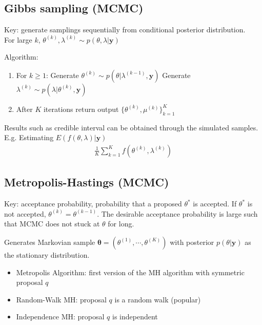       \subsection{Gibbs sampling (MCMC)}

      Key: generate samplings sequentially from conditional
      posterior distribution.\\For large $k$,
      $\theta^{(k)}, \lambda^{(k)}\sim p(\theta,
      \lambda|\mathbf{y})$

      Algorithm:

      \begin{enumerate}
          \item For $k\geq 1$:
              \subitem[1.1] Generate $\theta^{(k)}\sim p(\theta| \lambda^{(k-1)}, \mathbf{y})$
              \subitem[1.2] Generate $\lambda^{(k)}\sim p(\lambda| \theta^{(k)}, \mathbf{y})$
          \item After $K$ iterations return output
              $\{\theta^{(k)}, \mu^{(k)}\}_{k=1}^K$
      \end{enumerate}

      Results such as credible interval can be obtained
      through the simulated samples.
      E.g. Estimating $E(f(\theta, \lambda)|\mathbf{y})$
      \begin{align*}
          \frac{1}{K}\sum_{k=1}^K f(\theta^{(k)},
          \lambda^{(k)})
      \end{align*}

      \subsection{Metropolis-Hastings (MCMC)}

      Key: acceptance probability, probability that a
      proposed $\theta^*$ is accepted. If $\theta^*$ is not
      accepted, $\theta^{(k)} = \theta^{(k-1)}$. The
      desirable acceptance probability is large such that
      MCMC does not stuck at $\theta$ for long.

      Generates Markovian sample $\mathbf{\theta} =
      (\theta^{(1)}, \cdots, \theta^{(K)})$ with posterior
      $p(\theta|\mathbf{y})$ as the stationary distribution.

      \begin{itemize}
          \item Metropolis Algorithm: first version of the
              MH algorithm with symmetric proposal $q$
          \item Random-Walk MH: proposal $q$ is a random
              walk (popular)
          \item Independence MH: proposal $q$ is independent
      \end{itemize}

